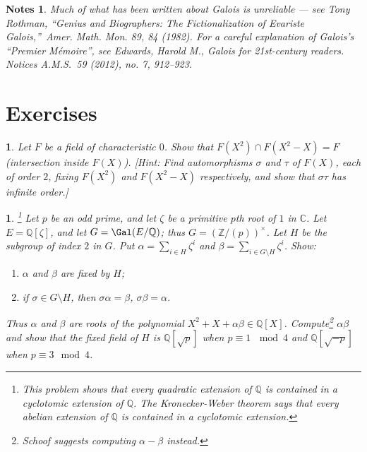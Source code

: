 \documentclass[a4paper,11pt,final,openany]{memoir}
\newtheorem*{nt}{Notes}
\newtheorem{exercise}[Y]{}
\theoremstyle{nonumberplain}
\begin{document}
\begin{nt}
Much of what has been written about Galois is unreliable --- see Tony Rothman,
\textquotedblleft Genius and Biographers: The Fictionalization of Evariste
Galois,\textquotedblright\ Amer. Math. Mon. 89, 84 (1982). For a careful
explanation of Galois's \textquotedblleft Premier
M\'{e}moire\textquotedblright, see Edwards, Harold M., Galois for 21st-century
readers. Notices A.M.S.~59 (2012), no. 7, 912--923.
\end{nt}

\section{Exercises}

\begin{exercise}
\label{x11} Let $F$ be a field of characteristic $0$. Show that $F(X^{2})\cap
F(X^{2}-X)=F$ (intersection inside $F(X)$). [Hint: Find automorphisms $\sigma$
and $\tau$ of $F(X)$, each of order $2$, fixing $F(X^{2})$ and $F(X^{2}-X)$
respectively, and show that $\sigma\tau$ has infinite order.]
\end{exercise}

\begin{exercise}
\label{x12}\footnote{This problem shows that every quadratic extension of
${\mathbb{Q}}$ is contained in a cyclotomic extension of ${\mathbb{Q}}$. The
Kronecker-Weber theorem says that \textit{every} abelian extension of
${\mathbb{Q}}$ is contained in a cyclotomic extension.} Let $p$ be an odd
prime, and let $\zeta$ be a primitive $p$th root of $1$ in $\mathbb{C}$. Let
$E={\mathbb{Q}}[\zeta]$, and let $G=\Gal(E/{\mathbb{Q}})$; thus $G=(\mathbb{Z}%
/(p))^{\times}$. Let $H$ be the subgroup of index $2$ in $G$. Put $\alpha
=\sum_{i\in H}\zeta^{i}$ and $\beta=\sum_{i\in G\setminus H}\zeta^{i}$. Show:

\begin{enumerate}
\item $\alpha$ and $\beta$ are fixed by $H$;

\item if $\sigma\in G\setminus H$, then $\sigma\alpha=\beta$, $\sigma
\beta=\alpha$.
\end{enumerate}

\noindent Thus $\alpha$ and $\beta$ are roots of the polynomial $X^{2}%
+X+\alpha\beta\in{\mathbb{Q}}[X]$. Compute\footnote{Schoof suggests computing
$\alpha-\beta$ instead.} $\alpha\beta$ and show that the fixed field of $H$ is
${\mathbb{Q}}[\sqrt{p}]$ when $p\equiv1\,\mod4$ and ${\mathbb{Q}}[\sqrt{-p}]$
when $p\equiv3\mod4$.
\end{exercise}
\end{document}
